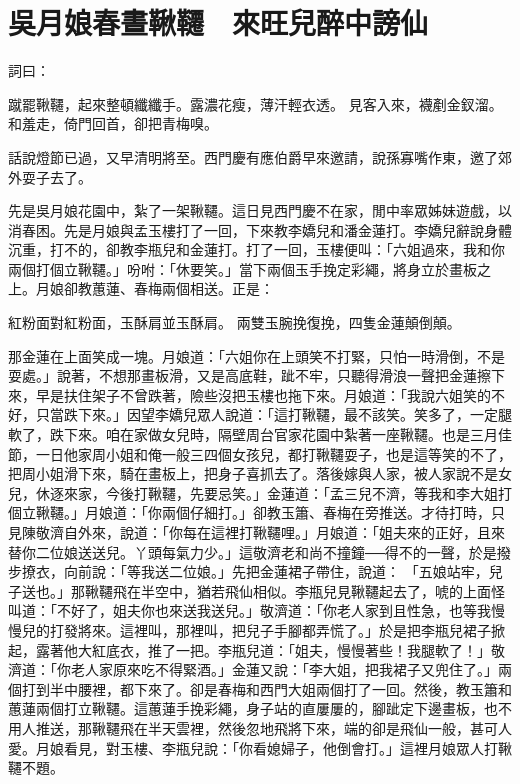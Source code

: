 %

\chapter{吳月娘春晝鞦韆　來旺兒醉中謗仙}


\begin{showcontents}{}


詞曰：

蹴罷鞦韆，起來整頓纖纖手。露濃花瘦，薄汗輕衣透。
見客入來，襪剷金釵溜。和羞走，倚門回首，卻把青梅嗅。

話說燈節已過，又早清明將至。西門慶有應伯爵早來邀請，說孫寡嘴作東，邀了郊外耍子去了。

先是吳月娘花園中，紮了一架鞦韆。這日見西門慶不在家，閒中率眾姊妹遊戲，以消春困。先是月娘與孟玉樓打了一回，下來教李嬌兒和潘金蓮打。李嬌兒辭說身體沉重，打不的，卻教李瓶兒和金蓮打。打了一回，玉樓便叫：「六姐過來，我和你兩個打個立鞦韆。」吩咐：「休要笑。」當下兩個玉手挽定彩繩，將身立於畫板之上。月娘卻教蕙蓮、春梅兩個相送。正是：

紅粉面對紅粉面，玉酥肩並玉酥肩。
兩雙玉腕挽復挽，四隻金蓮顛倒顛。

那金蓮在上面笑成一塊。月娘道：「六姐你在上頭笑不打緊，只怕一時滑倒，不是耍處。」說著，不想那畫板滑，又是高底鞋，跐不牢，只聽得滑浪一聲把金蓮擦下來，早是扶住架子不曾跌著，險些沒把玉樓也拖下來。月娘道：「我說六姐笑的不好，只當跌下來。」因望李嬌兒眾人說道：「這打鞦韆，最不該笑。笑多了，一定腿軟了，跌下來。咱在家做女兒時，隔壁周台官家花園中紮著一座鞦韆。也是三月佳節，一日他家周小姐和俺一般三四個女孩兒，都打鞦韆耍子，也是這等笑的不了，把周小姐滑下來，騎在畫板上，把身子喜抓去了。落後嫁與人家，被人家說不是女兒，休逐來家，今後打鞦韆，先要忌笑。」金蓮道：「孟三兒不濟，等我和李大姐打個立鞦韆。」月娘道：「你兩個仔細打。」卻教玉簫、春梅在旁推送。才待打時，只見陳敬濟自外來，說道：「你每在這裡打鞦韆哩。」月娘道：「姐夫來的正好，且來替你二位娘送送兒。丫頭每氣力少。」這敬濟老和尚不撞鐘──得不的一聲，於是撥步撩衣，向前說：「等我送二位娘。」先把金蓮裙子帶住，說道： 「五娘站牢，兒子送也。」那鞦韆飛在半空中，猶若飛仙相似。李瓶兒見鞦韆起去了，唬的上面怪叫道：「不好了，姐夫你也來送我送兒。」敬濟道：「你老人家到且性急，也等我慢慢兒的打發將來。這裡叫，那裡叫，把兒子手腳都弄慌了。」於是把李瓶兒裙子掀起，露著他大紅底衣，推了一把。李瓶兒道：「姐夫，慢慢著些！我腿軟了！」敬濟道：「你老人家原來吃不得緊酒。」金蓮又說：「李大姐，把我裙子又兜住了。」兩個打到半中腰裡，都下來了。卻是春梅和西門大姐兩個打了一回。然後，教玉簫和蕙蓮兩個打立鞦韆。這蕙蓮手挽彩繩，身子站的直屢屢的，腳跐定下邊畫板，也不用人推送，那鞦韆飛在半天雲裡，然後忽地飛將下來，端的卻是飛仙一般，甚可人愛。月娘看見，對玉樓、李瓶兒說：「你看媳婦子，他倒會打。」這裡月娘眾人打鞦韆不題。


\end{showcontents}

